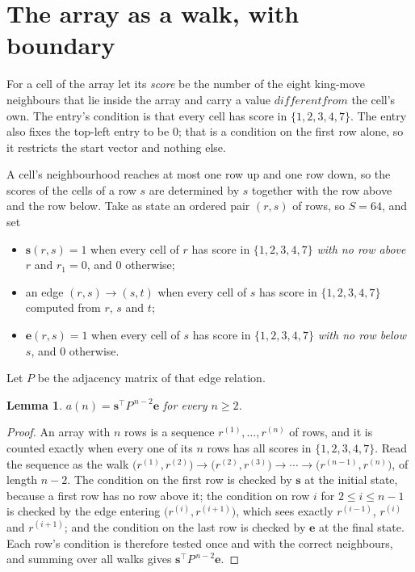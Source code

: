 \documentclass[11pt,a4paper]{article}
\theoremstyle{plain}
\newtheorem{lemma}[theorem]{Lemma}
\theoremstyle{definition}
\begin{document}
\section{The array as a walk, with boundary}

For a cell of the array let its \emph{score} be the number of the eight king-move neighbours that lie inside
the array and carry a value $different from$ the cell's own. The entry's condition is that every cell
has score in $\{1,2,3,4,7\}$. The entry also fixes the top-left entry to be $0$; that is a condition on the first row alone, so it restricts the start vector and nothing else.

A cell's neighbourhood reaches at most one row up and one row down, so the scores of the
cells of a row $s$ are determined by $s$ together with the row above and the row below.
Take as state an ordered pair $(r,s)$ of rows, so $S=64$, and set
\begin{itemize}
\item $\mathbf{s}(r,s)=1$ when every cell of $r$ has score in $\{1,2,3,4,7\}$ \emph{with no row
above $r$} and $r_1=0$, and $0$ otherwise;
\item an edge $(r,s)\to(s,t)$ when every cell of $s$ has score in $\{1,2,3,4,7\}$ computed from
$r$, $s$ and $t$;
\item $\mathbf{e}(r,s)=1$ when every cell of $s$ has score in $\{1,2,3,4,7\}$ \emph{with no row
below $s$}, and $0$ otherwise.
\end{itemize}
Let $P$ be the adjacency matrix of that edge relation.

\begin{lemma}\label{lem:walk}
$a(n)=\mathbf{s}^{\!\top}P^{\,n-2}\mathbf{e}$ for every $n\ge2$.
\end{lemma}

\begin{proof}
An array with $n$ rows is a sequence $r^{(1)},\dots,r^{(n)}$ of rows, and it is counted
exactly when every one of its $n$ rows has all scores in $\{1,2,3,4,7\}$. Read the sequence as the
walk $\bigl(r^{(1)},r^{(2)}\bigr)\to\bigl(r^{(2)},r^{(3)}\bigr)\to\cdots\to
\bigl(r^{(n-1)},r^{(n)}\bigr)$, of length $n-2$. The condition on the first row is
checked by $\mathbf{s}$ at the initial state, because a first row has no row above it; the
condition on row $i$ for $2\le i\le n-1$ is checked by the edge entering
$\bigl(r^{(i)},r^{(i+1)}\bigr)$, which sees exactly $r^{(i-1)}$, $r^{(i)}$ and
$r^{(i+1)}$; and the condition on the last row is checked by $\mathbf{e}$ at the final
state. Each row's condition is therefore tested once and with the correct neighbours, and
summing over all walks gives $\mathbf{s}^{\!\top}P^{\,n-2}\mathbf{e}$.
\end{proof}
\end{document}
